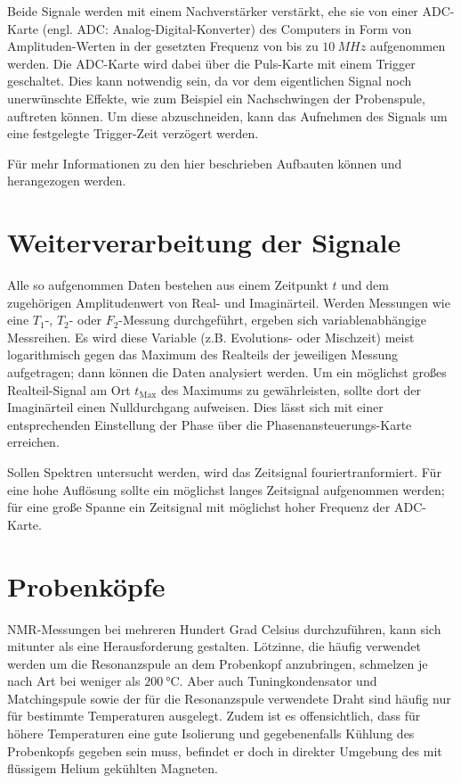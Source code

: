 Beide Signale werden mit einem Nachverstärker verstärkt, ehe sie von einer ADC-Karte (engl. ADC: Analog-Digital-Konverter) des Computers in Form von Amp\-li\-tu\-den-Wer\-ten in der gesetzten Frequenz von bis zu $\SI{10}{MHz}$ aufgenommen werden. Die ADC-Karte wird dabei über die Puls-Karte mit einem Trigger geschaltet. Dies kann notwendig sein, da vor dem eigentlichen Signal noch unerwünschte Effekte, wie zum Beispiel ein Nachschwingen der Probenspule, auftreten können. Um diese abzuschneiden, kann das Aufnehmen des Signals um eine festgelegte Trigger-Zeit verzögert werden.

Für mehr Informationen zu den hier beschrieben Aufbauten können \cite{lueg_implementierung_2016} und \cite{tilly_master} herangezogen werden.



\section{Weiterverarbeitung der Signale} \label{section:exp:weiterverarbeitung}

Alle so aufgenommen Daten bestehen aus einem Zeitpunkt $t$ und dem zugehörigen Amplitudenwert von Real- und Imaginärteil. Werden Messungen wie eine $T_1$-, $T_2$- oder $F_2$-Messung durchgeführt, ergeben sich variablenabhängige Messreihen. Es wird diese Variable (z.B. Evolutions- oder Mischzeit) meist logarithmisch gegen das Maximum des Realteils der jeweiligen Messung aufgetragen; dann können die Daten analysiert werden. Um ein möglichst großes Realteil-Signal am Ort $t_\text{Max}$ des Maximums zu gewährleisten, sollte dort der Imaginärteil einen Nulldurchgang aufweisen. Dies lässt sich mit einer entsprechenden Einstellung der Phase über die Phasenansteuerungs-Karte erreichen.

Sollen Spektren untersucht werden, wird das Zeitsignal fouriertranformiert. Für eine hohe Auflösung sollte ein möglichst langes Zeitsignal aufgenommen werden; für eine große Spanne ein Zeitsignal mit möglichst hoher Frequenz der ADC-Karte.



\section{Probenköpfe} \label{section:exp:probenkoepfe}

NMR-Messungen bei mehreren Hundert Grad Celsius durchzuführen, kann sich mitunter als eine Herausforderung gestalten. Lötzinne, die häufig verwendet werden um die Resonanzspule an dem Probenkopf anzubringen, schmelzen je nach Art bei weniger als $\SI{200}{\degreeCelsius}$. Aber auch Tuningkondensator und Matchingspule sowie der für die Resonanzspule verwendete Draht sind häufig nur für bestimmte Temperaturen ausgelegt. Zudem ist es offensichtlich, dass für höhere Temperaturen eine gute Isolierung und gegebenenfalls Kühlung des Probenkopfs gegeben sein muss, befindet er doch in direkter Umgebung des mit flüssigem Helium gekühlten Magneten.

